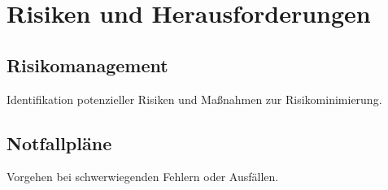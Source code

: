 \section{Risiken und Herausforderungen}
\subsection{Risikomanagement}
Identifikation potenzieller Risiken und Maßnahmen zur Risikominimierung.

\subsection{Notfallpläne}
Vorgehen bei schwerwiegenden Fehlern oder Ausfällen.